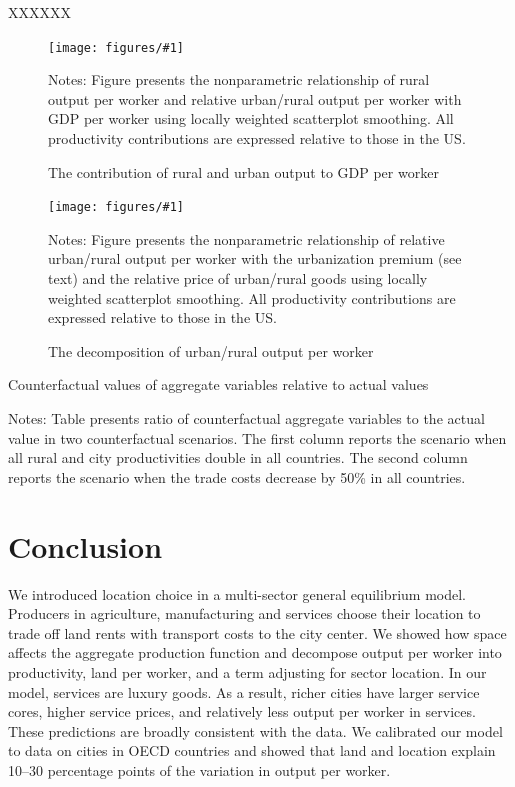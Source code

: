 \documentclass[12pt]{article}
\newcommand{\dofigure}[3]{\begin{figure}
\begin{centering}
\texttt{[image: figures/\#1]}
  \caption{#2\label{fig:#1}}
\end{centering}

\noindent \footnotesize{#3}
\end{figure}}
\begin{document}
XXXXXX


\dofigure{../../research_designs/city_level_inputs/output/rural_urban_contributions}{The contribution of rural and urban output to GDP per worker}{Notes: Figure presents the nonparametric relationship of rural output per worker and relative urban/rural output per worker with GDP per worker using locally weighted scatterplot smoothing. All productivity contributions are expressed relative to those in the US.}

\dofigure{../../research_designs/city_level_inputs/output/urban_contributions}{The decomposition of urban/rural output per worker}{Notes: Figure presents the nonparametric relationship of relative urban/rural output per worker with the urbanization premium (see text) and the relative price of urban/rural goods  using locally weighted scatterplot smoothing. All productivity contributions are expressed relative to those in the US.}

\begin{table}[h!]
  \begin{center}
  \caption{Counterfactual values of aggregate variables relative to actual values\label{tab:counterfactuals}}
  
  \end{center}
  \noindent \footnotesize{Notes: Table presents ratio of counterfactual aggregate variables to the actual value in two counterfactual scenarios. The first column reports the scenario when all rural and city productivities double in all countries. The second column reports the scenario when the trade costs decrease by 50\% in all countries.}
\end{table}


\section{Conclusion}
We introduced location choice in a multi-sector general equilibrium model. Producers in agriculture, manufacturing and services choose their location to trade off land rents with transport costs to the city center. We showed how space affects the aggregate production function and decompose output per worker into productivity, land per worker, and a term adjusting for sector location. In our model, services are luxury goods. As a result, richer cities have larger service cores, higher service prices, and relatively less output per worker in services. These predictions are broadly consistent with the data. We calibrated our model to data on cities in OECD countries and showed that land and location explain 10--30 percentage points of the variation in output per worker.
\end{document}
